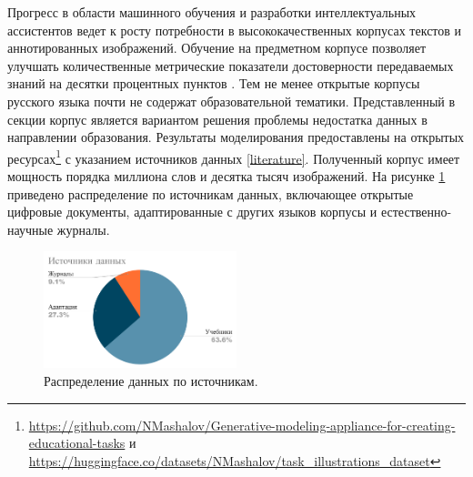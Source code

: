 Прогресс в области машинного обучения и разработки интеллектуальных ассистентов ведет к росту потребности в
высококачественных корпусах текстов и аннотированных изображений. Обучение на предметном корпусе
позволяет улучшать количественные метрические показатели достоверности передаваемых знаний 
на десятки процентных пунктов \cite{tinn2023fine}. Тем не менее открытые корпусы русского языка 
\cite{hung2022multi2woz} \cite{dmitrieva2023automatic} \cite{ivanov2023new} почти не содержат образовательной тематики.
Представленный в секции корпус является вариантом решения проблемы недостатка данных в направлении образования. 
Результаты моделирования предоставлены на открытых ресурсах\footnote{
\url{https://github.com/NMashalov/Generative-modeling-appliance-for-creating-educational-tasks}
и \url{https://huggingface.co/datasets/NMashalov/task_illustrations_dataset}
} с указанием источников данных \ref{literature}. Полученный корпус имеет мощность порядка миллиона слов и десятка тысяч изображений. На рисунке \ref{distribution} приведено
распределение по источникам данных, включающее открытые цифровые документы, адаптированные с других языков корпусы и естественно-научные 
журналы.
\begin{figure}[h]
    \centering
    \includegraphics[width=0.5\textwidth]{assets/work/dataset/diagram.png}
    \caption{Распределение данных по источникам.}
    \label{distribution}
\end{figure}